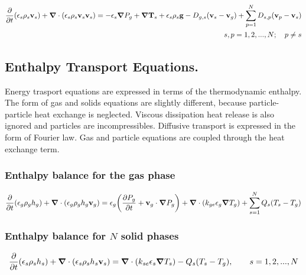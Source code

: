 \begin{eqnarray}
\htmlimage{}
\frac{\partial}{\partial t}(\epsilon_{s}\rho_{s}{\bf v}_{s})+
\mbox{\boldmath $\nabla$}\cdot (\epsilon_{s}\rho_{s}{\bf v}_{s}{\bf v}_{s}) =
-\epsilon_{s}\mbox{\boldmath $\nabla$}P_{g}+
\mbox{\boldmath $\nabla$}{\bf T}_{s}
+\epsilon_{s}\rho_{s}{\bf g} -
D_{g,s}({\bf v}_{s}-{\bf v}_{g}) + 
\sum_{p=1}^{N} D_{s,p}({\bf v}_{p} - {\bf v}_{s}) \\
\label{eq:solid_mom}
s,p=1,2,...,N; \quad p \neq s
\nonumber
\end{eqnarray}

\subsection{Enthalpy Transport Equations.}
Energy trasport equations are expressed in terms of the thermodynamic enthalpy.
The form of gas and solids equations are slightly different, because
particle-particle heat exchange is neglected. Viscous dissipation heat 
release is also ignored and particles are incompressibles. 
Diffusive transport is expressed in the form
of Fourier law. Gas and particle equations are coupled through
the heat exchange term.

\subsubsection{\hspace{1cm}Enthalpy balance for the gas phase}

\begin{equation}
\frac{\partial}{\partial t}(\epsilon_{g}\rho_{g}h_{g})+
\mbox{\boldmath $\nabla$}\cdot (\epsilon_{g}\rho_{g}h_{g}{\bf v}_{g})=
\epsilon_{g}\bigg(\frac{\partial P_{g}}{\partial t}+{\bf v}_{g}\cdot
\mbox{\boldmath $\nabla$}P_{g}\bigg) +
\mbox{\boldmath $\nabla$}\cdot (k_{ge}\epsilon_{g}
\mbox{\boldmath $\nabla$}T_{g})+\sum_{s=1}^{N} Q_{s}(T_{s}-T_{g})
\label{eq:gas_enth}
\end{equation}


\subsubsection{\hspace{1cm}Enthalpy balance for $N$ solid phases}
\begin{equation}
\frac{\partial}{\partial t}(\epsilon_{s}\rho_{s}h_{s})+
\mbox{\boldmath $\nabla$}\cdot (\epsilon_{s}\rho_{s}h_{s}{\bf v}_{s})=
\mbox{\boldmath $\nabla$}\cdot (k_{se}\epsilon_{s}\mbox{\boldmath 
$\nabla$}T_{s})
-Q_{s}(T_{s}-T_{g}), \hbox{\qquad $s = 1,2,...,N$}
\label{eq:solid_enth}
\end{equation}

